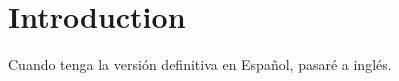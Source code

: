 \chapter*{Introduction} %
\label{chap:introduction}
Cuando tenga la versión definitiva en Español, pasaré a inglés. 